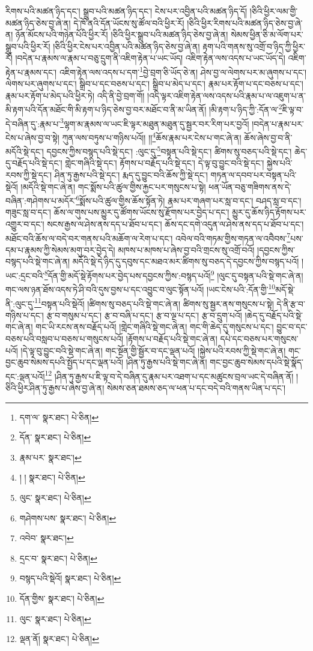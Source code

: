 རིགས་པའི་མཚན་ཉིད་དང་། སྒྲུབ་པའི་མཚན་ཉིད་དང་། ངེས་པར་འབྱིན་པའི་མཚན་ཉིད་དོ། །ཅིའི་ཕྱིར་ལམ་གྱི་མཚན་ཉིད་ཅེས་བྱ་ཞེ་ན། དེ་ཁོ་ནའི་དོན་ཡོངས་སུ་ཚོལ་བའི་ཕྱིར་རོ། །ཅིའི་ཕྱིར་རིགས་པའི་མཚན་ཉིད་ཅེས་བྱ་ཞེ་ན། ཉོན་མོངས་པའི་གཉེན་པོའི་ཕྱིར་རོ། །ཅིའི་ཕྱིར་སྒྲུབ་པའི་མཚན་ཉིད་ཅེས་བྱ་ཞེ་ན། སེམས་ཕྱིན་ཅི་མ་ལོག་པར་སྒྲུབ་པའི་ཕྱིར་རོ། །ཅིའི་ཕྱིར་ངེས་པར་འབྱིན་པའི་མཚན་ཉིད་ཅེས་བྱ་ཞེ་ན། རྟག་པའི་གནས་སུ་འགྲོ་བ་ཉིད་ཀྱི་ཕྱིར་རོ། །བདེན་པ་རྣམས་ལ་རྣམ་པ་བཅུ་དྲུག་ནི་འཇིག་རྟེན་པ་ཡང་ཡོད། འཇིག་རྟེན་ལས་འདས་པ་ཡང་ཡོད་དེ། འཇིག་རྟེན་པ་རྣམས་དང་། འཇིག་རྟེན་ལས་འདས་པ་དག་\footnote{དག་ལ་  སྣར་ཐང་།  པེ་ཅིན། }བྱེ་བྲག་ཅི་ཡོད་ཅེ་ན། ཤེས་བྱ་ལ་ལེགས་པར་མ་ཞུགས་པ་དང་། ལེགས་པར་ཞུགས་པ་དང་། སྒྲིབ་པ་དང་བཅས་པ་དང་། སྒྲིབ་པ་མེད་པ་དང་། རྣམ་པར་རྟོག་པ་དང་བཅས་པ་དང་། རྣམ་པར་རྟོག་པ་མེད་པའི་ཕྱིར་ཏེ། འདི་ནི་བྱེ་བྲག་གོ། །འདི་ལྟར་འཇིག་རྟེན་ལས་འདས་པའི་རྣམ་པ་ལ་འཇུག་པ་ན་མི་རྟག་པའི་དོན་མཐོང་གི་མི་རྟག་པ་ཉིད་ཅེས་བྱ་བར་མཐོང་བ་ནི་མ་ཡིན་ནོ། །མི་རྟག་པ་ཉིད་ཀྱི་:དོན་ལ་\footnote{དོན་  སྣར་ཐང་།  པེ་ཅིན། }ཇི་ལྟ་བ་དེ་བཞིན་དུ་:རྣམ་པ་\footnote{རྣམ་པར་  སྣར་ཐང་། }ལྷག་མ་རྣམས་ལ་ཡང་ཇི་ལྟར་མཐུན་མཐུན་དུ་སྦྱར་བར་རིག་པར་བྱའོ། །བདེན་པ་རྣམ་པར་ངེས་པ་ཞེས་བྱ་བ་སྟེ། ཀུན་ལས་བཏུས་པ་གཉིས་པའོ།། །།\footnote{། །  སྣར་ཐང་།  པེ་ཅིན། }ཆོས་རྣམ་པར་ངེས་པ་གང་ཞེ་ན། ཆོས་ཞེས་བྱ་བ་ནི་མདོའི་སྡེ་དང་། དབྱངས་ཀྱིས་བསྙད་པའི་སྡེ་དང་། :ལུང་དུ་\footnote{ལུང་  སྣར་ཐང་།  པེ་ཅིན། }བསྟན་པའི་སྡེ་དང་། ཚིགས་སུ་བཅད་པའི་སྡེ་དང་། ཆེད་དུ་བརྗོད་པའི་སྡེ་དང་། གླེང་གཞིའི་སྡེ་དང་། རྟོགས་པ་བརྗོད་པའི་སྡེ་དང་། དེ་ལྟ་བུ་བྱུང་བའི་སྡེ་དང་། སྐྱེས་པའི་རབས་ཀྱི་སྡེ་དང་། ཤིན་ཏུ་རྒྱས་པའི་སྡེ་དང་། རྨད་དུ་བྱུང་བའི་ཆོས་ཀྱི་སྡེ་དང་། གཏན་ལ་དབབ་པར་བསྟན་པའི་སྡེའོ། །མདོའི་སྡེ་གང་ཞེ་ན། གང་སྨོས་པའི་ཚུལ་གྱིས་རྐྱང་པར་གསུངས་པ་སྟེ། ཕན་ཡོན་བཅུ་གཟིགས་ནས་དེ་བཞིན་:གཤེགས་པ་མདོར་\footnote{གཤེགས་པས་  སྣར་ཐང་།  པེ་ཅིན། }སྨོས་པའི་ཚུལ་གྱིས་ཆོས་སྟོན་ཏེ། རྣམ་པར་གཞག་པར་སླ་བ་དང་། བཤད་སླ་བ་དང་། གཟུང་སླ་བ་དང་། ཆོས་ལ་གུས་པས་མྱུར་དུ་ཚོགས་ཡོངས་སུ་རྫོགས་པར་བྱེད་པ་དང་། མྱུར་དུ་ཆོས་ཉིད་རྟོགས་པར་འགྱུར་བ་དང་། སངས་རྒྱས་ལ་ཤེས་ནས་དད་པ་ཐོབ་པ་དང་། ཆོས་དང་དགེ་འདུན་ལ་ཤེས་ནས་དད་པ་ཐོབ་པ་དང་། མཐོང་བའི་ཆོས་ལ་བདེ་བར་གནས་པའི་མཆོག་ལ་རེག་པ་དང་། འབེལ་བའི་གཏམ་གྱིས་གཏན་ལ་འབཻབས་\footnote{འབེབ་  སྣར་ཐང་། }པས་དམ་པ་རྣམས་ཀྱི་སེམས་མགུ་བར་བྱེད་དེ། མཁས་པ་མཁས་པ་ཞེས་བྱ་བའི་གྲངས་སུ་འགྲོ་བའོ། །དབྱངས་ཀྱིས་བསྙད་པའི་སྡེ་གང་ཞེ་ན། མདོའི་སྡེ་དེ་ཉིད་དུ་དབུས་དང་མཐའ་མར་ཚིགས་སུ་བཅད་དེ་དབྱངས་ཀྱིས་བསྙད་པའོ། །ཡང་:དྲང་བའི་\footnote{དྲང་བ་  སྣར་ཐང་།  པེ་ཅིན། }དོན་གྱི་མདོ་སྡེ་རྟོགས་པར་བྱེད་པས་དབྱངས་ཀྱིས་:བསྙད་པའོ།\footnote{བསྙད་པའི་སྡེའོ།  སྣར་ཐང་།  པེ་ཅིན། } །ལུང་དུ་བསྟན་པའི་སྡེ་གང་ཞེ་ན། གང་ལས་ཉན་ཐོས་འདས་ཏེ་ཤི་བའི་དུས་བྱས་པ་དང་འབྱུང་བ་ལུང་སྟོན་པའོ། །ཡང་ངེས་པའི་:དོན་གྱི་\footnote{དོན་གྱིས་  སྣར་ཐང་།  པེ་ཅིན། }མདོ་སྡེ་ནི་:ལུང་དུ་\footnote{ལུང་  སྣར་ཐང་།  པེ་ཅིན། }བསྟན་པའི་སྡེའོ། །ཚིགས་སུ་བཅད་པའི་སྡེ་གང་ཞེ་ན། ཚིགས་སུ་སྦྱར་ནས་གསུངས་པ་སྟེ། དེ་ནི་རྩ་བ་གཉིས་པ་དང་། རྩ་བ་གསུམ་པ་དང་། རྩ་བ་བཞི་པ་དང་། རྩ་བ་ལྔ་པ་དང་། རྩ་བ་དྲུག་པའོ། །ཆེད་དུ་བརྗོད་པའི་སྡེ་གང་ཞེ་ན། གང་ཡི་རངས་ནས་བརྗོད་པའོ། །གླེང་གཞིའི་སྡེ་གང་ཞེ་ན། གང་གི་ཆེད་དུ་གསུངས་པ་དང་། བྱུང་བ་དང་བཅས་པའི་བསླབ་པ་བཅས་པ་གསུངས་པའོ། །རྟོགས་པ་བརྗོད་པའི་སྡེ་གང་ཞེ་ན། དཔེ་དང་བཅས་པར་གསུངས་པའོ། །དེ་ལྟ་བུ་བྱུང་བའི་སྡེ་གང་ཞེ་ན། གང་སྔོན་གྱི་སྦྱོར་བ་དང་ལྡན་པའོ། །སྐྱེས་པའི་རབས་ཀྱི་སྡེ་གང་ཞེ་ན། གང་བྱང་ཆུབ་སེམས་དཔའི་སྤྱོད་པ་དང་ལྡན་པའོ། །ཤིན་ཏུ་རྒྱས་པའི་སྡེ་གང་ཞེ་ན། གང་བྱང་ཆུབ་སེམས་དཔའི་སྡེ་སྣོད་དང་:ལྡན་པའོ།\footnote{ལྡན་ནོ།  སྣར་ཐང་།  པེ་ཅིན། } །ཤིན་ཏུ་རྒྱས་པ་ཇི་ལྟ་བ་དེ་བཞིན་དུ་རྣམ་པར་འཐག་པ་དང་མཚུངས་བྲལ་ཡང་དེ་བཞིན་ནོ། །ཅིའི་ཕྱིར་ཤིན་ཏུ་རྒྱས་པ་ཞེས་བྱ་ཞེ་ན། སེམས་ཅན་ཐམས་ཅད་ལ་ཕན་པ་དང་བདེ་བའི་གནས་ཡིན་པ་དང་། 